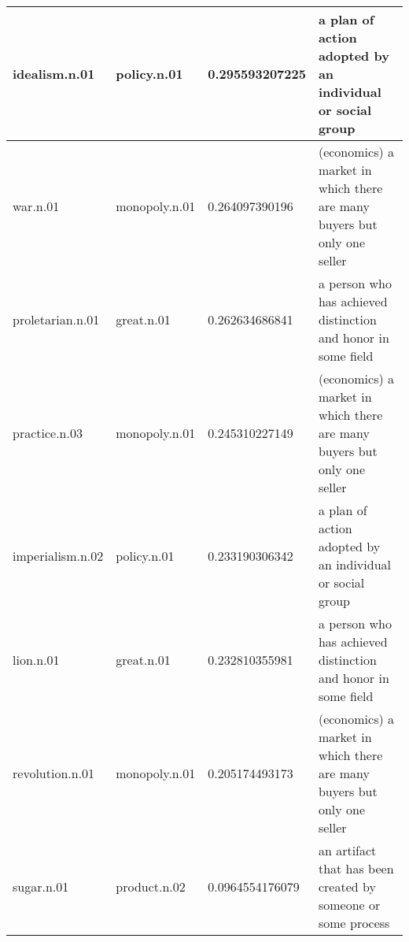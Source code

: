 \begin{center}
\begin{tabular}{ | l | l | l | l |}
idealism.n.01 & policy.n.01 & 0.295593207225 & a plan of action adopted by an individual or social group\\ \hline
war.n.01 & monopoly.n.01 & 0.264097390196 & (economics) a market in which there are many buyers but only one seller\\ \hline
proletarian.n.01 & great.n.01 & 0.262634686841 & a person who has achieved distinction and honor in some field\\ \hline
practice.n.03 & monopoly.n.01 & 0.245310227149 & (economics) a market in which there are many buyers but only one seller\\ \hline
imperialism.n.02 & policy.n.01 & 0.233190306342 & a plan of action adopted by an individual or social group\\ \hline
lion.n.01 & great.n.01 & 0.232810355981 & a person who has achieved distinction and honor in some field\\ \hline
revolution.n.01 & monopoly.n.01 & 0.205174493173 & (economics) a market in which there are many buyers but only one seller\\ \hline
sugar.n.01 & product.n.02 & 0.0964554176079 & an artifact that has been created by someone or some process\\ \hline
\end{tabular}
\end{center}